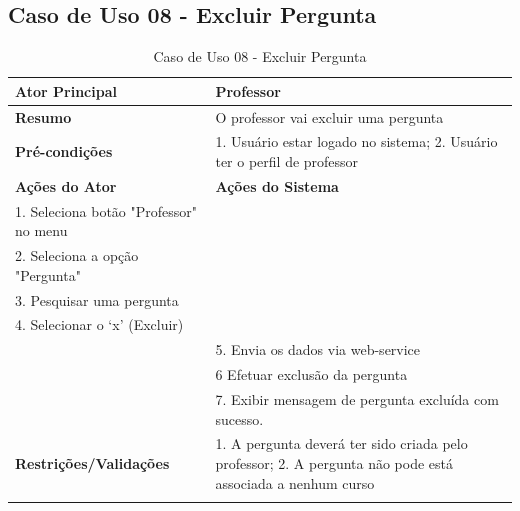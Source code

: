 \subsection{Caso de Uso 08 - Excluir Pergunta}
\label{sc:case8}
\begin{center}
\begin{longtable}{p{8cm}|p{8cm}}
    \hline
    \textbf{Ator Principal} & Professor \\
    \hline
    \textbf{Resumo} & O professor vai excluir uma pergunta \\
    \hline
    \textbf{Pr\'{e}-condi\c{c}\~{o}es} & 1. Usuário estar logado no sistema; 2. Usuário ter o perfil de professor \\
    \hline
    \textbf{A\c{c}\~{o}es do Ator} & \textbf{A\c{c}\~{o}es do Sistema} \\
    \hline
    1. Seleciona botão "Professor" no menu \\
    \hline
    2. Seleciona a opção "Pergunta" \\
	\hline
    3. Pesquisar uma pergunta \\
	\hline
    4. Selecionar o ‘x’ (Excluir) \\
    \hline
    & 5. Envia os dados via web-service \\
	\hline
    & 6 Efetuar exclusão da pergunta \\
	\hline
    & 7. Exibir mensagem de pergunta excluída com sucesso. \\
    \hline
    \hline
    \textbf{Restri\c{c}\~{o}es/Valida\c{c}\~{o}es} & 1. A pergunta deverá ter sido criada pelo professor; 2. A pergunta não pode está associada a nenhum curso \\
\hline
\caption{Caso de Uso 08 - Excluir Pergunta}
\end{longtable}
\end{center}


